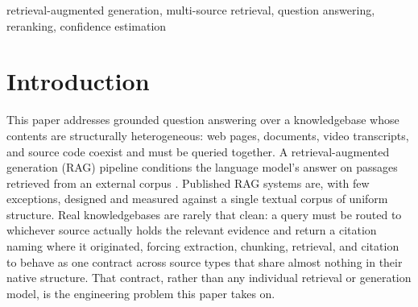 \documentclass[conference]{IEEEtran}
\begin{document}
\maketitle

\begin{abstract}
Most retrieval-augmented generation (RAG) systems are built and evaluated over a single, homogeneous corpus. Real knowledge work seldom fits that assumption: a user may accumulate a website, several PDFs, a lecture, and a code repository, then query them through one interface. We present SAGE (Semantic Analysis and Generation Engine), which ingests four structurally different source types (crawled websites, PDFs, YouTube transcripts, and GitHub repositories) through a shared ingest-chunk-embed-index contract and answers questions over them with a single retrieval-reranking-generation pipeline. Three design decisions anchor it: a deterministic \emph{source-overview chunk} that makes broad questions retrievable without an LLM call; a hybrid semantic-lexical reranking formula paired with a \emph{diversity floor} that guarantees fair citation representation across combined sources; and a confidence heuristic that gates refusal in a citation-only Grounded Mode. We validate SAGE through its test suite and an isolated harness running the unmodified production code against three live sources over fourteen query executions. A concrete defect, the silent starvation of one source's evidence in multi-source queries, surfaced during testing and is corrected by the diversity floor. SAGE contributes a checkable set of engineering decisions for grounded QA over heterogeneous knowledgebases, introduces no new model, and documents its limitations candidly.
\end{abstract}

\begin{IEEEkeywords}
retrieval-augmented generation, multi-source retrieval, question answering, reranking, confidence estimation
\end{IEEEkeywords}

\section{Introduction}

This paper addresses grounded question answering over a knowledgebase whose contents are structurally heterogeneous: web pages, documents, video transcripts, and source code coexist and must be queried together. A retrieval-augmented generation (RAG) pipeline conditions the language model's answer on passages retrieved from an external corpus \cite{lewis2020rag}. Published RAG systems are, with few exceptions, designed and measured against a single textual corpus of uniform structure. Real knowledgebases are rarely that clean: a query must be routed to whichever source actually holds the relevant evidence and return a citation naming where it originated, forcing extraction, chunking, retrieval, and citation to behave as one contract across source types that share almost nothing in their native structure. That contract, rather than any individual retrieval or generation model, is the engineering problem this paper takes on.
\end{document}
